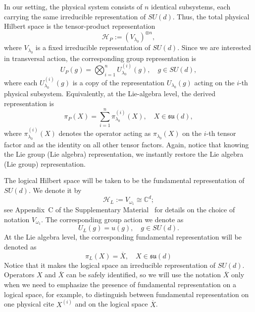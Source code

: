 \documentclass[10pt,twocolumn,superscriptaddress,aps,amsmath,amssymb,citeautoscript,floatfix,prx,longbibliography]{revtex4-2}
\newcounter{alg}
\theoremstyle{plain}
\theoremstyle{plain}
\theoremstyle{plain}
\theoremstyle{plain}
\theoremstyle{plain}
\theoremstyle{plain}
\begin{document}
In our setting, the physical system consists of \(n\) identical subsystems, each carrying the same irreducible representation of \(SU(d)\). Thus, the total physical Hilbert space is the tensor-product representation
\begin{equation}\label{eq:phys_space_rep}
    \mathcal H_P := (V_{\lambda_0})^{\otimes n},
\end{equation}
where \(V_{\lambda_0}\) is a fixed irreducible representation of \(SU(d)\). Since we are interested in transversal action, the corresponding group representation is
\begin{equation}\label{eq:group_phys_space_rep}
    U_P(g)
    =
    \bigotimes_{i=1}^n U^{(i)}_{\lambda_0}(g), \quad g\in SU(d),
\end{equation}
where each \(U^{(i)}_{\lambda_0}(g)\) is a copy of the representation \(U_{\lambda_0}(g)\) acting on the \(i\)-th physical subsystem.
Equivalently, at the Lie-algebra level, the derived representation is
\begin{equation}\label{eq:alg_phys_space_rep}
    \pi_P(X)
    =
    \sum_{i=1}^n \pi^{(i)}_{\lambda_0}(X),
    \quad X\in\mathfrak{su}(d),
\end{equation}
where \(\pi^{(i)}_{\lambda_0}(X)\) denotes the operator acting as \(\pi_{\lambda_0}(X)\) on the \(i\)-th tensor factor and as the identity on all other tensor factors. Again, notice that knowing the Lie group (Lie algebra) representation, we instantly restore the Lie algebra (Lie group) representation.

The logical Hilbert space will be taken to be the fundamental representation of \(SU(d)\). We denote it by
\begin{equation}\label{eq:log_space_rep}
    \mathcal H_L := V_{\omega_1}\cong \mathbb C^d;
\end{equation}
see Appendix~C of the Supplementary Material~\cite{SuppMat} for details on the choice of notation $V_{\omega_1}$. The corresponding group action we denote as  
$$
U_L(g)=u(g), \quad g\in SU(d).
$$
At the Lie algebra level, the corresponding fundamental representation will be denoted as
$$
\pi_L(X)=\overline{X},\quad X\in\mathfrak{su}(d)
$$
Notice that it makes the logical space an irreducible representation of $SU(d)$. Operators $X$ and $\overline{X}$ can be safely identified, so we will use the notation $\overline{X}$ only when we need to emphasize the presence of fundamental representation on a logical space, for example, to distinguish between fundamental representation on one physical cite $X^{(i)}$ and on the logical space $\overline{X}$.
\end{document}
